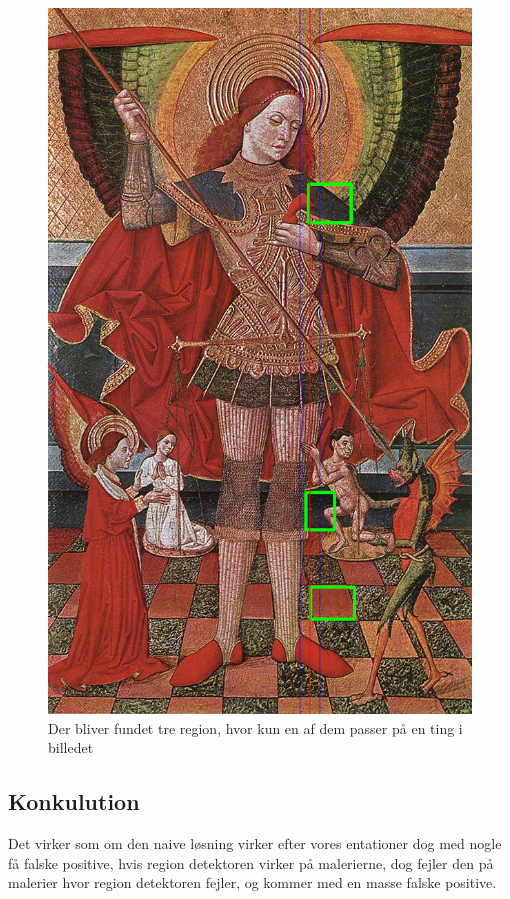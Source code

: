 \begin{figure}[h!!]
	\begin{center}
		\includegraphics[scale=0.3,angle=0]{afsnit/afprovning/billeder/naive_losning/naiv_virker_ikke3.png}
	\end{center}
	\caption[]{Der bliver fundet tre region, hvor kun en af dem passer
	på en ting i billedet}
	\label{naiv_virker_ikke3}
\end{figure}
\clearpage

\subsection{Konkulution}
Det virker som om den naive løsning virker efter vores entationer dog
med nogle få falske positive, hvis region detektoren virker på
malerierne, dog fejler den på malerier hvor region detektoren fejler, og
kommer med en masse falske positive.
